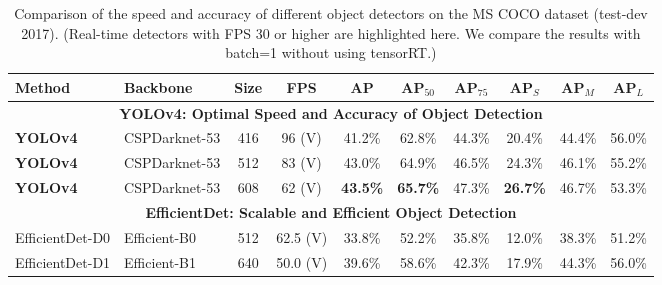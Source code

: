 \documentclass[10pt,twocolumn,letterpaper]{article}
\begin{document}
\begin{table*}[h]
	\centering
	\begin{threeparttable}[h]
		\footnotesize
		\caption{Comparison of the speed and accuracy of different object detectors on the MS COCO dataset (test-dev 2017). (Real-time detectors with FPS 30 or higher are highlighted here. We compare the results with batch=1 without using tensorRT.)}
		\label{table:volta}
		\begin{tabular}{llcccccccc}
			\toprule
			\textbf{Method} & \textbf{Backbone} & \textbf{Size} & \textbf{FPS} & \textbf{AP} & \textbf{AP$_{50}$} & \textbf{AP$_{75}$} & \textbf{AP$_S$} & \textbf{AP$_M$} & \textbf{AP$_L$} \\	
			\midrule
			\multicolumn{10}{c}{\textbf{YOLOv4: Optimal Speed and Accuracy of Object Detection}} \\
			\rowcolor{cyan}\textbf{YOLOv4} & CSPDarknet-53 & 416 & 96 (V) & 41.2\% & 62.8\% & 44.3\% & 20.4\% & 44.4\% & 56.0\% \\
			\rowcolor{cyan}\textbf{YOLOv4} & CSPDarknet-53 & 512 & 83 (V) & 43.0\% & 64.9\% & 46.5\% & 24.3\% & 46.1\% & 55.2\% \\
			\rowcolor{cyan}\textbf{YOLOv4} & CSPDarknet-53 & 608 & 62 (V) & \textbf{43.5\%} & \textbf{65.7\%} & 47.3\% & \textbf{26.7\%} & 46.7\% & 53.3\% \\
			\midrule
			\multicolumn{10}{c}{\textbf{EfficientDet: Scalable and Efficient Object Detection \cite{tan2019efficientdet}}} \\
			\rowcolor{cyan}EfficientDet-D0 & Efficient-B0 & 512 & 62.5 (V) & 33.8\% & 52.2\% & 35.8\% & 12.0\% & 38.3\% & 51.2\% \\
			\rowcolor{cyan}EfficientDet-D1 & Efficient-B1 & 640 & 50.0 (V) & 39.6\% & 58.6\% & 42.3\% & 17.9\% & 44.3\% & 56.0\% \\

\end{tabular}
\end{threeparttable}
\end{table*}
\end{document}

